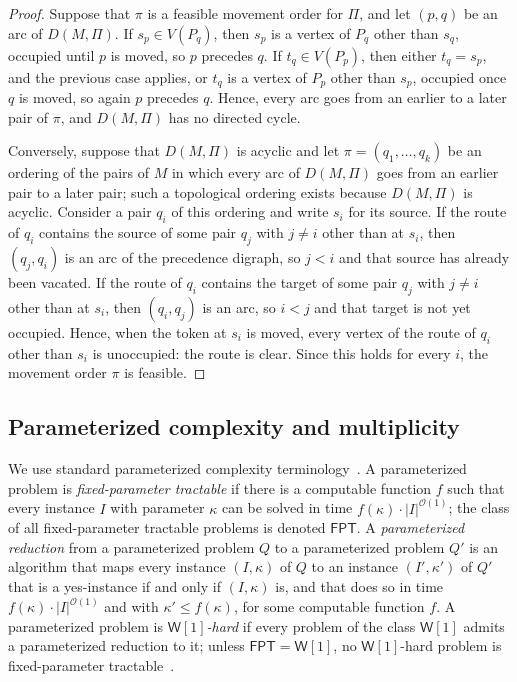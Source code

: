 \documentclass[a4paper,USenglish,thm-restate]{lipics-v2021}
\theoremstyle{problemstyle}
\begin{document}
\begin{proof}
Suppose that $\pi$ is a feasible movement order for $\Pi$, and let $(p,q)$ be
an arc of $D(M,\Pi)$. If $s_p\in V(P_q)$, then $s_p$ is a vertex of $P_q$
other than $s_q$, occupied until $p$ is moved, so $p$ precedes $q$. If
$t_q\in V(P_p)$, then either $t_q=s_p$, and the previous case applies, or
$t_q$ is a vertex of $P_p$ other than $s_p$, occupied once $q$ is moved, so
again $p$ precedes $q$. Hence, every arc goes from an earlier to a later pair
of $\pi$, and $D(M,\Pi)$ has no directed cycle.

Conversely, suppose that $D(M,\Pi)$ is acyclic and let $\pi=(q_1,\ldots,q_k)$
be an ordering of the pairs of $M$ in which every arc of $D(M,\Pi)$ goes from
an earlier pair to a later pair; such a topological ordering exists
because $D(M,\Pi)$ is acyclic. Consider a pair $q_i$ of this ordering
and write $s_i$ for its source. If the route of $q_i$ contains the source of
some pair $q_j$ with $j\neq i$ other than at $s_i$, then $(q_j,q_i)$ is an arc of the
precedence digraph, so $j<i$ and that source has already been vacated. If the
route of $q_i$ contains the target of some pair $q_j$ with $j\neq i$ other than at $s_i$,
then $(q_i,q_j)$ is an arc, so $i<j$ and that target is not yet occupied.
Hence, when the token at $s_i$ is moved, every vertex of the route of $q_i$
other than $s_i$ is unoccupied: the route is clear. Since this holds for
every $i$, the movement order $\pi$ is feasible.
\end{proof}

\subsection{Parameterized complexity and multiplicity}
We use standard parameterized complexity
terminology~\cite{cygan2015parameterized}. A parameterized problem is
\emph{fixed-parameter tractable} if there is a computable function $f$ such
that every instance $I$ with parameter $\kappa$ can be solved in time
$f(\kappa)\cdot|I|^{\mathcal{O}(1)}$; the class of all fixed-parameter
tractable problems is denoted $\textsf{FPT}$. A \emph{parameterized
reduction} from a parameterized problem $Q$ to a parameterized problem $Q'$
is an algorithm that maps every instance $(I,\kappa)$ of $Q$ to an instance
$(I',\kappa')$ of $Q'$ that is a yes-instance if and only if $(I,\kappa)$
is, and that does so in time $f(\kappa)\cdot|I|^{\mathcal{O}(1)}$ and with
$\kappa'\le f(\kappa)$, for some computable function $f$. A parameterized
problem is \emph{$\textsf{W}[1]$-hard} if every problem of the class
$\textsf{W}[1]$ admits a parameterized reduction to it; unless
$\textsf{FPT}=\textsf{W}[1]$, no $\textsf{W}[1]$-hard problem is
fixed-parameter tractable~\cite{cygan2015parameterized}.
\end{document}
